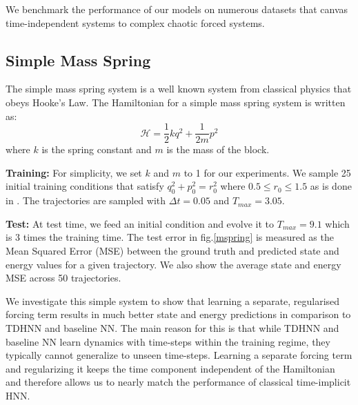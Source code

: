 \documentclass[twoside]{article}
\begin{document}
We benchmark the performance of our models on numerous datasets that canvas time-independent systems to complex chaotic forced systems. 

\subsection{Simple Mass Spring}

The simple mass spring system is a well known system from classical physics that obeys Hooke's Law. The Hamiltonian for a simple mass spring system is written as:
\begin{equation}
\mathcal{H} = \frac{1}{2}kq^2 + \frac{1}{2m}p^2 
\end{equation}
where $k$ is the spring constant and $m$ is the mass of the block. 

\textbf{Training:} For simplicity, we set $k$ and $m$ to 1 for our experiments. We sample 25 initial training conditions that satisfy $q_0^2+p_0^2 = r_0^2$ where $0.5 \leq r_0 \leq 1.5$ as is done in \cite{greydanus_hamiltonian_2019}. The trajectories are sampled with $\Delta t =0.05$ and $T_{max} = 3.05$.  

\textbf{Test:} At test time, we feed an initial condition and evolve it to $T_{max}=9.1$ which is 3 times the training time. The test error in fig.\ref{mspring} is measured as the Mean Squared Error (MSE) between the ground truth and predicted state and energy values for a given trajectory. We also show the average state and energy MSE  across 50 trajectories. 

We investigate this simple system to show that learning a separate, regularised forcing term results in much better state and energy predictions in comparison to TDHNN and baseline NN. The main reason for this is that while TDHNN and baseline NN learn dynamics with time-steps within the training regime, they typically cannot generalize to unseen time-steps. Learning a separate forcing term and regularizing it keeps the time component independent of the Hamiltonian and therefore allows us to nearly match the performance of classical time-implicit HNN.
\end{document}
